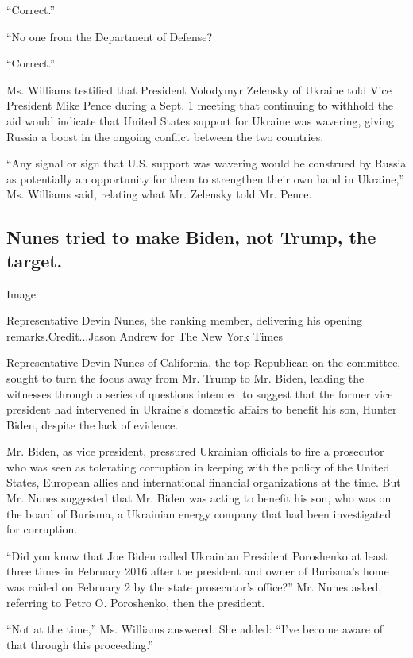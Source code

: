 ``Correct.''

``No one from the Department of Defense?

``Correct.''

Ms. Williams testified that President Volodymyr Zelensky of Ukraine told
Vice President Mike Pence during a Sept. 1 meeting that continuing to
withhold the aid would indicate that United States support for Ukraine
was wavering, giving Russia a boost in the ongoing conflict between the
two countries.

``Any signal or sign that U.S. support was wavering would be construed
by Russia as potentially an opportunity for them to strengthen their own
hand in Ukraine,'' Ms. Williams said, relating what Mr. Zelensky told
Mr. Pence.

\hypertarget{nunes-tried-to-make-biden-not-trump-the-target}{%
\subsection{Nunes tried to make Biden, not Trump, the
target.}\label{nunes-tried-to-make-biden-not-trump-the-target}}

Image

Representative Devin Nunes, the ranking member, delivering his opening
remarks.Credit...Jason Andrew for The New York Times

Representative Devin Nunes of California, the top Republican on the
committee, sought to turn the focus away from Mr. Trump to Mr. Biden,
leading the witnesses through a series of questions intended to suggest
that the former vice president had intervened in Ukraine's domestic
affairs to benefit his son, Hunter Biden, despite the lack of evidence.

Mr. Biden, as vice president, pressured Ukrainian officials to fire a
prosecutor who was seen as tolerating corruption in keeping with the
policy of the United States, European allies and international financial
organizations at the time. But Mr. Nunes suggested that Mr. Biden was
acting to benefit his son, who was on the board of Burisma, a Ukrainian
energy company that had been investigated for corruption.

``Did you know that Joe Biden called Ukrainian President Poroshenko at
least three times in February 2016 after the president and owner of
Burisma's home was raided on February 2 by the state prosecutor's
office?'' Mr. Nunes asked, referring to Petro O. Poroshenko, then the
president.

``Not at the time,'' Ms. Williams answered. She added: ``I've become
aware of that through this proceeding.''

